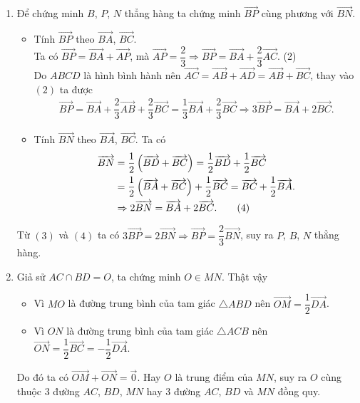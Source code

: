 \begin{baitap}
{\begin{enumerate}
			\item Để chứng minh $B$, $P$, $N$ thẳng hàng ta chứng minh $\overrightarrow{BP}$ cùng phương với $\overrightarrow{BN}$.
			\begin{itemize}
				\item Tính $\overrightarrow{BP} $ theo $\overrightarrow{BA}$, $\overrightarrow{BC}$.\\
				Ta có $\overrightarrow{BP} = \overrightarrow{BA} + \overrightarrow{AP}$, mà $\overrightarrow{AP} = \dfrac{2}{3} \Rightarrow \overrightarrow{BP} = \overrightarrow{BA} + \dfrac{2}{3} \overrightarrow{AC}$. \hfill(2)\\
				Do $ABCD$ là hình bình hành nên $\overrightarrow{AC} = \overrightarrow{AB} + \overrightarrow{AD} = \overrightarrow{AB} + \overrightarrow{BC}$, thay vào $(2)$ ta được
				\begin{align}
					\overrightarrow{BP} = \overrightarrow{BA} + \dfrac{2}{3} \overrightarrow{AB} + \dfrac{2}{3} \overrightarrow{BC} = \dfrac{1}{3} \overrightarrow{BA} + \dfrac{2}{3} \overrightarrow{BC} \Rightarrow 3 \overrightarrow{BP} = \overrightarrow{BA} + 2 \overrightarrow{BC}. \tag{3}
				\end{align}
				\item Tính $\overrightarrow{BN} $ theo $\overrightarrow{BA}$, $\overrightarrow{BC}$. Ta có
				\begin{align}
					\overrightarrow{BN} &= \dfrac{1}{2} \left( \overrightarrow{BD} + \overrightarrow{BC} \right) = \dfrac{1}{2} \overrightarrow{BD} + \dfrac{1}{2}  \overrightarrow{BC} \notag\\ &= \dfrac{1}{2} \left( \overrightarrow{BA}+ \overrightarrow{BC} \right) + \dfrac{1}{2} \overrightarrow{BC} = \overrightarrow{BC}+ \dfrac{1}{2} \overrightarrow{BA}. \notag \\
					&\Rightarrow  2 \overrightarrow{BN} = \overrightarrow{BA} + 2 \overrightarrow{BC}. \tag{4}
				\end{align}
			\end{itemize}
			Từ $(3)$ và $(4)$ ta có $3 \overrightarrow{BP} = 2 \overrightarrow{BN} \Rightarrow \overrightarrow{BP} = \dfrac{2}{3} \overrightarrow{BN}$, suy ra $P$, $B$, $N$ thẳng hàng.
			
			\item Giả sử $AC \cap BD = O$, ta chứng minh $O \in MN$. Thật vậy
			\begin{itemize}
				\item Vì $MO$ là đường trung bình của tam giác $\triangle ABD$ nên $\overrightarrow{OM} = \dfrac{1}{2} \overrightarrow{DA}$.
				\item Vì $ON$ là đường trung bình của tam giác $\triangle ACB$ nên $\overrightarrow{ON} = \dfrac{1}{2} \overrightarrow{BC} = - \dfrac{1}{2} \overrightarrow{DA}$.
			\end{itemize}
			Do đó ta có $\overrightarrow{OM}+ \overrightarrow{ON} = \overrightarrow{0}$. Hay $O$ là trung điểm của $MN$, suy ra $O$ cùng thuộc $3$ đường $AC$, $BD$, $MN$ hay $3$ đường $AC$, $BD$ và $MN$ đồng quy.
		\end{enumerate}
	}
\end{baitap} 



